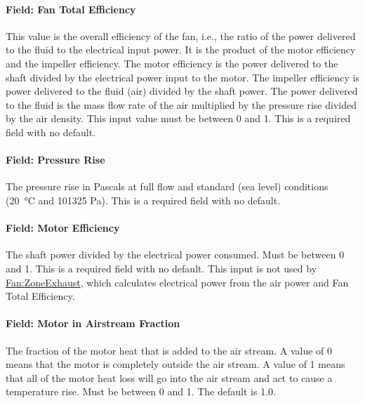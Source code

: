 \paragraph{Field: Fan Total Efficiency}\label{field-fan-total-efficiency-4}

This value is the overall efficiency of the fan, i.e., the ratio of the power delivered to the fluid to the electrical input power. It is the product of the motor efficiency and the impeller efficiency. The motor efficiency is the power delivered to the shaft divided by the electrical power input to the motor. The impeller efficiency is power delivered to the fluid (air) divided by the shaft power. The power delivered to the fluid is the mass flow rate of the air multiplied by the pressure rise divided by the air density. This input value must be between 0 and 1. This is a required field with no default.

\paragraph{Field: Pressure Rise}\label{field-pressure-rise-4}

The pressure rise in Pascals at full flow and standard (sea level) conditions (\SI{20}{\celsius} and 101325 Pa). This is a required field with no default.

\paragraph{Field: Motor Efficiency}\label{field-motor-efficiency-3}

The shaft power divided by the electrical power consumed. Must be between 0 and 1. This is a required field with no default. This input is not used by \hyperref[fanzoneexhaust]{Fan:ZoneExhaust}, which calculates electrical power from the air power and Fan Total Efficiency.

\paragraph{Field: Motor in Airstream Fraction}\label{field-motor-in-airstream-fraction-3}

The fraction of the motor heat that is added to the air stream. A value of 0 means that the motor is completely outside the air stream. A value of 1 means that all of the motor heat loss will go into the air stream and act to cause a temperature rise. Must be between 0 and 1. The default is 1.0.

